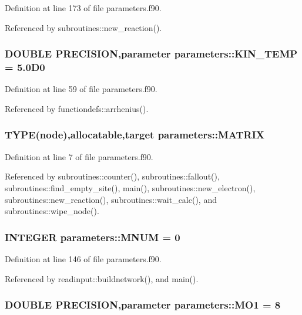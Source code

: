 Definition at line 173 of file parameters.f90.

Referenced by subroutines::new\_\-reaction().\hypertarget{namespaceparameters_a144dd87a3ad4a40138cad0b8d26ee282}{
\subsubsection[{KIN\_\-TEMP}]{\setlength{\rightskip}{0pt plus 5cm}DOUBLE PRECISION,parameter {\bf parameters::KIN\_\-TEMP} = 5.0D0}}
\label{namespaceparameters_a144dd87a3ad4a40138cad0b8d26ee282}


Definition at line 59 of file parameters.f90.

Referenced by functiondefs::arrhenius().\hypertarget{namespaceparameters_a1d2ec6532bce135a8fc18f3542969a8d}{
\subsubsection[{MATRIX}]{\setlength{\rightskip}{0pt plus 5cm}TYPE({\bf node}),allocatable,target {\bf parameters::MATRIX}}}
\label{namespaceparameters_a1d2ec6532bce135a8fc18f3542969a8d}


Definition at line 7 of file parameters.f90.

Referenced by subroutines::counter(), subroutines::fallout(), subroutines::find\_\-empty\_\-site(), main(), subroutines::new\_\-electron(), subroutines::new\_\-reaction(), subroutines::wait\_\-calc(), and subroutines::wipe\_\-node().\hypertarget{namespaceparameters_a8834adf2777bfd145f2ba3e2ca2d5f46}{
\subsubsection[{MNUM}]{\setlength{\rightskip}{0pt plus 5cm}INTEGER {\bf parameters::MNUM} = 0}}
\label{namespaceparameters_a8834adf2777bfd145f2ba3e2ca2d5f46}


Definition at line 146 of file parameters.f90.

Referenced by readinput::buildnetwork(), and main().\hypertarget{namespaceparameters_a6d254c62ce30ae2227377164deadbabe}{
\subsubsection[{MO1}]{\setlength{\rightskip}{0pt plus 5cm}DOUBLE PRECISION,parameter {\bf parameters::MO1} = 8}}
\label{namespaceparameters_a6d254c62ce30ae2227377164deadbabe}


